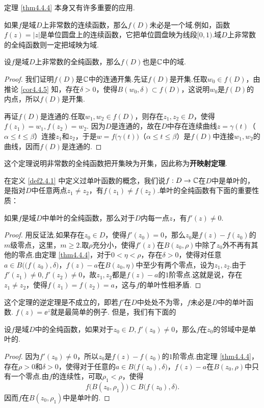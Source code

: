 定理 \ref{thm4.4.4} 本身又有许多重要的应用.

如果$f$是域$D$上非常数的连续函数，那么$f(D)$未必是一个域.例如，函数$f(z)=|z|$是单位圆盘上的连续函数，它把单位圆盘映为线段$[0,1)$.域$D$上非常数的全纯函数则一定把域映为域.

\begin{theorem}\label{thm4.4.6}
  设$f$是域$D$上非常数的全纯函数，那么$f(D)$也是$\mathbb C$中的域.
\end{theorem}
\begin{proof}
  我们证明$f(D)$是$\mathbb C$中的连通开集.先证$f(D)$是开集.任取$w_0\in f(D)$，由推论 \ref{cor4.4.5} 知，存在$\delta>0$，使得$B(w_0,\delta)\subset f(D)$，这说明$w_0$是$f(D)$的内点，所以$f(D)$是开集.

  再证$f(D)$是连通的.任取$w_1,w_2\in f(D)$，则存在$z_1,z_2\in D$，使得$f(z_1)=w_1,f(z_2)=w_2$. 因为$D$是连通的，故在$D$中存在连续曲线$z=\gamma(t)$（$\alpha\le t\le \beta$）连接$z_1$和$z_2$，于是$w=f\big(\gamma(t)\big)$（$\alpha\le t\le \beta$）是$f(D)$中连接$w_1,w_2$的曲线，因而$f(D)$是连通的.
\end{proof}

这个定理说明非常数的全纯函数把开集映为开集，因此称为\textbf{开映射定理}.

在定义 \ref{def2.4.1} 中定义过单叶函数的概念，我们说$f:D\to\mathbb C$在$D$中是单叶的，是指对$D$中任意两点$z_1\ne z_2$，有$f(z_1)\ne f(z_2)$.单叶的全纯函数有下面的重要性质：
\begin{theorem}\label{thm4.4.7}
  如果$f$是域$D$中单叶的全纯函数，那么对于$D$内每一点$z$，有$f'(z)\ne0$.
\end{theorem}
\begin{proof}
  用反证法.如果存在$z_0\in D$，使得$f'(z_0)=0$，那么$z_0$是$f(z)-f(z_0)$的$m$级零点，这里，$m\ge2$.取$\rho$充分小，使得$f'(z)$在$B(z_0,\rho)$中除了$z_0$外不再有其他的零点.由定理 \ref{thm4.4.4}，对于$0<\eta<\rho$，存在$\delta>0$，使得对任意$a\in B\big((f(z_0),\delta\big)$，$f(z)-a$在$B(z_0,\eta)$中至少有两个零点，设为$z_1,z_2$.由于$f'(z_1)\ne0,f'(z_2)\ne0$，故$z_1,z_2$都是$f(z)-a$的$1$阶零点.这就是说，存在$z_1\ne z_2$，使得$f(z_1)=f(z_2)=a$，这与$f$的单叶性相矛盾.
\end{proof}

这个定理的逆定理是不成立的，即若$f'$在$D$中处处不为零，$f$未必是$D$中的单叶函数. $f(z)=\ee^z$就是最简单的例子. 但是，我们有下面的
\begin{theorem}\label{thm4.4.8}
  设$f$是域$D$中的全纯函数，如果对于$z_0\in D,f'(z_0)\ne0$，那么$f$在$z_0$的邻域中是单叶的.
\end{theorem}
\begin{proof}
  因为$f'(z_0)\ne0$，所以$z_0$是$f(z)-f(z_0)$的$1$阶零点.由定理 \ref{thm4.4.4}，存在$\rho>0$和$\delta>0$，使得对于任意的$a\in B\big(f(z_0),\delta\big)$，$f(z)-a$在$B(z_0,\rho)$中只有一个零点.由$f$的连续性，可取$\rho_1<\rho$，使得
  \[
    f\big(B(z_0,\rho_1)\big)\subset B\big(f(z_0),\delta\big).
  \]
  因而$f$在$B(z_0,\rho_1)$中是单叶的.
\end{proof}


